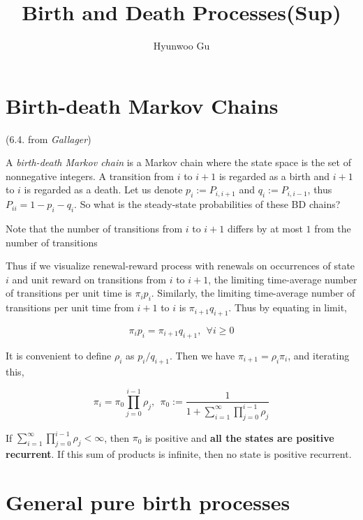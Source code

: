 \documentclass[12pt]{article}
\theoremstyle{nonumberbreak}
\begin{document}
\title{\textbf{Birth and Death Processes(Sup)}}
\author{Hyunwoo Gu}
\date{}

\maketitle

\section{Birth-death Markov Chains}(6.4. from \textit{Gallager})

A \textit{birth-death Markov chain} is a Markov chain where the state space is the set of nonnegative integers. A transition from $i$ to $i+1$ is regarded as a birth and $i+1$ to $i$ is regarded as a death. Let us denote $p_i := P_{i,i+1}$ and $q_i := P_{i,i-1}$, thus $P_{ii} = 1 - p_i - q_i$. So what is the steady-state probabilities of these BD chains?

Note that the number of transitions from $i$ to $i+1$ differs by at most $1$ from the number of transitions 


Thus if we visualize renewal-reward process with renewals on occurrences of state $i$ and unit reward on transitions from $i$ to $i+1$, the limiting time-average number of transitions per unit time is $\pi_i p_i$. Similarly, the limiting time-average number of transitions per unit time from $i+1$ to $i$ is $\pi_{i+1} q_{i+1}$. Thus by equating in limit,

$$
\pi_i p_i = \pi_{i+1} q_{i+1}, \ \ \forall i\ge 0
$$


It is convenient to define $\rho_i$ as $p_i / q_{i+1}$. Then we have $\pi_{i+1} = \rho_i \pi_i$, and iterating this,

$$
\pi_i = \pi_0 \prod_{j=0}^{i-1} \rho_j, \ \ \pi_0 := \frac{1}{1 + \sum_{i=1}^\infty \prod_{j=0}^{i-1} \rho_j}
$$

If $\sum_{i=1}^\infty \prod_{j=0}^{i-1} \rho_j < \infty$, then $\pi_0$ is positive and \textbf{all the states are positive recurrent}. If this sum of products is infinite, then no state is positive recurrent. 


\section{General pure birth processes}
\end{document}
